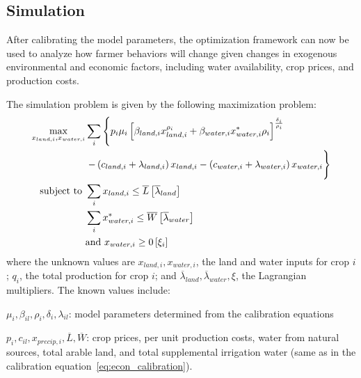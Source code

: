 \subsection{Simulation}
After calibrating the model parameters, the optimization framework can now be used to analyze how farmer behaviors will change given changes in exogenous environmental and economic factors, including water availability, crop prices, and production costs. 

The simulation problem is given by the following maximization problem:
\begin{equation}\label{eq:econ_simulation}
\begin{split}
    \max _ { x _ { land,i } , x _ { water,i }} &  \sum _ { i } \left\{ p _ { i } \mu _ { i } \left[ \beta _ { land,i } x _ { land,i } ^ { \rho _ { i } } + \beta _ { water,i } x _ { water,i } ^ { * } \rho _ { i } \right] ^ { \frac { \delta _ { i } } { \rho _ { i } } } \right.\\
    & \left. - \left( c _ { land,i } + \lambda _ { land,i } \right) x _ { land,i } - \left( c _ { water,i } + \lambda _ { water,i } \right) x _ { water,i } \vphantom{\sum_i} \right\} \\
    \text{subject to } & \sum _ { i } x _ { land,i } \leq \overline { L } \left[ \overline{\lambda} _ { land } \right] \\
    & \sum _ { i } x _ { water,i } ^ { * } \leq \overline { W } \left[ \overline{\lambda} _ { water } \right] \\
    & \text {and } x _ { water,i } \geq 0 \left[ \xi _ { i } \right]
\end{split}
\end{equation}
where the unknown values are $x _ { land,i } , x _ { water,i }$, the land and water inputs for crop $i$; $q _ { i }$, the total production for crop $i$; and $\overline{\lambda} _ { land }, \overline{\lambda} _ { water }, \xi$, the Lagrangian multipliers. The known values include:
\begin{itemize*}
    \item $\mu _ { i } , \beta _ { i l } , \rho _ { i } , \delta _ { i } , \lambda _ { i l }$: model parameters determined from the calibration equations
    \item $p _ { i } , c _ { i l } , x_{precip,i}, \overline { L } , \overline { W }$: crop prices, per unit production costs, water from natural sources, total arable land, and total supplemental irrigation water (same as in the calibration equation~\ref{eq:econ_calibration}).
\end{itemize*}

